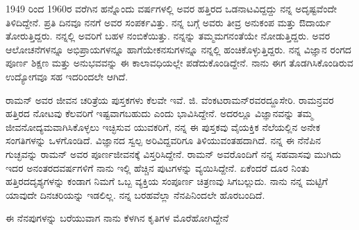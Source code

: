 \medskip

1949 ರಿಂದ 1960ರ ವರೆಗಿನ ಹನ್ನೊಂದು ವರ್ಷಗಳಲ್ಲಿ ಅವರ ಹತ್ತಿರದ ಒಡನಾಟವಿದ್ದದ್ದು ನನ್ನ ಅದೃಷ್ಟವೆಂದೇ ತಿಳಿದಿದ್ದೇನೆ. ಪ್ರತಿ ದಿನವೂ ನನಗೆ ಅವರ ಸಂಪರ್ಕವಿತ್ತು. ನನ್ನ ಬಗ್ಗೆ ಅವರು ತೀವ್ರ ಅನುಕಂಪ ಮತ್ತು ಔದಾರ್ಯ ತೋರುತ್ತಿದ್ದರು. ನನ್ನಲ್ಲಿ ಅವರಿಗೆ ಬಹಳ ನಂಬಿಕೆಯಿತ್ತು. ನನ್ನನ್ನು ತಮ್ಮ\break ಮಗನಂತೆಯೇ ನೋಡುತ್ತಿದ್ದರು. ಅವರ ಆಲೋಚನೆಗಳನ್ನೂ ಅಭಿಪ್ರಾಯಗಳನ್ನೂ ಹಾಗೆಯೇ\break ಕನಸುಗಳನ್ನೂ ನನ್ನಲ್ಲಿ ಹಂಚಿಕೊಳ್ಳುತ್ತಿದ್ದರು. ನನ್ನ ವಿಜ್ಞಾನ ರಂಗದ ಪೂರ್ಣ ಶಿಕ್ಷಣ ಮತ್ತು ಅನುಭವವನ್ನು ಈ ಕಾಲಾವಧಿಯಲ್ಲೇ ಪಡೆದುಕೊಂಡಿದ್ದೇನೆ. ನಾನು ಈಗ ತೊಡಗಿಸಿಕೊಂಡಿರುವ ಉದ್ಯೋಗವೂ ಸಹ ಇದರಿಂದಲೇ ಆಗಿದೆ. 

\medskip

ರಾಮನ್ ಅವರ ಜೀವನ ಚರಿತ್ರೆಯ ಪುಸ್ತಕಗಳು ಕೆಲವೇ ಇವೆ. \enginline{-}ಜಿ. ವೆಂಕಟರಾಮನ್‌‌ರವರದ್ದೂ\break ಸೇರಿ. ರಾಮನ್ರವರ ಹತ್ತಿರದ ನೋಟವು ಕೆಲವರಿಗೆ ಇಷ್ಟವಾಗಬಹುದು ಎಂದು ಭಾವಿಸಿದ್ದೇನೆ. ಅದರಲ್ಲೂ ವಿಜ್ಞಾನವನ್ನು ತಮ್ಮ ಜೀವನೋದ್ಯಮವಾಗಿಸಿಕೊಳ್ಳಲು ಇಚ್ಛಿಸುವ ಯುವಕರಿಗೆ, ನನ್ನ ಈ ಪುಸ್ತಕವು ವೈಯಕ್ತಿಕ ನೆಲೆಯಲ್ಲಿನ ಅನೇಕ ಸಂಗತಿಗಳನ್ನು ಒಳಗೊಂಡಿದೆ. ವಿಜ್ಞಾನದ ಸ್ವಲ್ಪ ಅರಿವಿದ್ದ\break ವರಿಗೂ ತಿಳಿಯುವಂತಹದಾಗಿದೆ. ನನ್ನ ಈ ನೆನೆಪಿನ ಗುಚ್ಛವನ್ನು ರಾಮನ್ ಅವರ ಪೂರ್ಣಜೀವನಕ್ಕೆ ವಿಸ್ತರಿಸಿದ್ದೇನೆ. ರಾಮನ್ ಅವರೊಂದಿಗೆ ನನ್ನ ಸಹವಾಸವು ಮುಗಿದು ಇದರ ಅನಂತರದ\break ವರ್ಷಗಳಿಗೆ ನಾನು ಇಲ್ಲಿ ಹೆಚ್ಚಿನ ಪುಟಗಳನ್ನು ವ್ಯಯಿಸಿದ್ದೇನೆ. ಏಕೆಂದರೆ ದೂರ ನಿಂತು ಹತ್ತಿರದ\break ದೃಶ್ಯಗಳನ್ನು ಕಂಡಾಗ ನಿಮಗೆ ಒಬ್ಬ ವ್ಯಕ್ತಿಯ ಸಂಪೂರ್ಣ ಚಿತ್ರಣವು ಸಿಗಬಲ್ಲುದು. ನಾನು ನನ್ನ ಮಟ್ಟಿಗೆ ಯಾವುದೇ ದಿನಚರಿಯನ್ನು ಇಡಲಿಲ್ಲ. ನನ್ನ ಬರಹವೆಲ್ಲಾ ನೆನಪಿನಿಂದಲೇ ಹೊರಬಂದಿದೆ.

\newpage	

ಈ ನೆನಪುಗಳನ್ನು ಬರೆಯುವಾಗ ನಾನು ಕೆಳಗಿನ ಕೃತಿಗಳ ಮೊರೆಹೋಗಿದ್ದೇನೆ\enginline{-}

